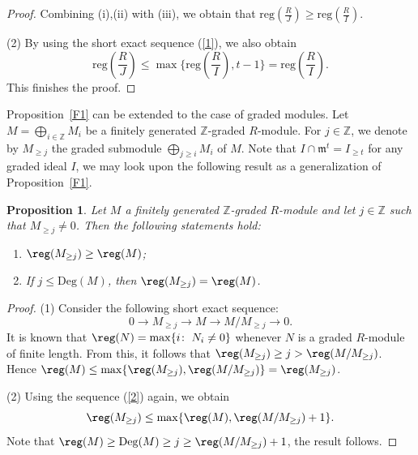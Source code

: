 \documentclass[12pt]{amsart}
\let\:=\colon
\newtheorem{Proposition}[Theorem]{Proposition}
\begin{document}
\begin{proof}
  Combining  (i),(ii) with (iii), we obtain that  $\mathrm{reg}(\frac{R}{J})\geq \mathrm{reg}(\frac{R}{I})$.


(2) By using the short exact sequence (\ref{1}),  we also obtain $$\mathrm{reg}(\frac{R}{J})\leq \max\{\mathrm{reg}(\frac{R}{I}), t-1\}=\mathrm{reg}(\frac{R}{I}).$$ This finishes the proof.
\end{proof}



Proposition~\ref{F1} can be extended  to the case of graded modules. Let $M=\bigoplus_{i\in \mathbb{Z}}M_i$ be a finitely generated $\mathbb{Z}$-graded $R$-module. For  $j\in \mathbb{Z}$, we denote by $M_{\geq j}$  the graded submodule $\bigoplus_{j\geq i}M_i$ of $M$. Note that $I\cap \mathfrak{m}^t=I_{\geq t}$ for any graded ideal $I$, we may look upon the following result as a generalization of Proposition~\ref{F1}.

\begin{Proposition}  Let $M$ a finitely generated $\mathbb{Z}$-graded $R$-module and let $j\in \mathbb{Z}$ such that $M_{\geq j}\neq 0$. Then the following statements hold:
\begin{enumerate}
\item $\reg(M_{\geq j})\geq \reg(M)$;

\item If $j\leq \mathrm{Deg}(M)$, then $\reg(M_{\geq j})=\reg(M)$.
\end{enumerate}

\end{Proposition}


\begin{proof} (1)  Consider the following short exact sequence: \begin{equation}\label{2} \tag{$\ddag$} 0\rightarrow M_{\geq j}\rightarrow M\rightarrow M/M_{\geq j}\rightarrow 0.\end{equation}
It is known that $\reg(N)=\max\{i\:\; N_i\neq 0\}$ whenever $N$ is a graded $R$-module of finite length. From this, it follows that  $\reg(M_{\geq j})\geq j> \reg(M/M_{\geq j})$. Hence $\reg(M)\leq \max\{\reg(M_{\geq j}), \reg(M/M_{\geq j})\}=\reg(M_{\geq j})$.

(2) Using the sequence (\ref{2}) again, we  obtain    $$\reg(M_{\geq j})\leq \max\{\reg(M), \reg(M/M_{\geq j})+1\}.$$  Note that $\reg(M)\geq \mathrm{Deg}(M)\geq j\geq \reg(M/M_{\geq j})+1$, the result follows.\end{proof}
\end{document}
